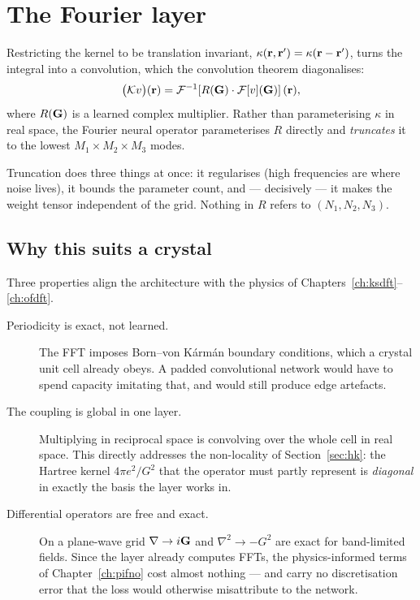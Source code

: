 \section{The Fourier layer}

Restricting the kernel to be translation invariant, $\kappa(\mathbf{r},\mathbf{r}')
= \kappa(\mathbf{r}-\mathbf{r}')$, turns the integral into a convolution, which the
convolution theorem diagonalises:
\begin{equation}
  \bigl(\mathcal{K}v\bigr)(\mathbf{r})
    = \mathcal{F}^{-1}\!\left[ R(\mathbf{G})\cdot \mathcal{F}[v](\mathbf{G}) \right](\mathbf{r}),
  \label{eq:fourierlayer}
\end{equation}
where $R(\mathbf{G})$ is a learned complex multiplier. Rather than parameterising
$\kappa$ in real space, the Fourier neural operator parameterises $R$ directly
and \emph{truncates} it to the lowest $M_1{\times}M_2{\times}M_3$ modes.

Truncation does three things at once: it regularises (high frequencies are
where noise lives), it bounds the parameter count, and --- decisively --- it
makes the weight tensor independent of the grid. Nothing in $R$ refers to
$(N_1,N_2,N_3)$.

\subsection{Why this suits a crystal}

Three properties align the architecture with the physics of
Chapters~\ref{ch:ksdft}--\ref{ch:ofdft}.

\begin{description}
  \item[Periodicity is exact, not learned.] The FFT imposes Born--von Kármán
    boundary conditions, which a crystal unit cell already obeys. A padded
    convolutional network would have to spend capacity imitating that, and
    would still produce edge artefacts.
  \item[The coupling is global in one layer.] Multiplying in reciprocal space
    is convolving over the whole cell in real space. This directly addresses
    the non-locality of Section~\ref{sec:hk}: the Hartree kernel
    $4\pi e^2/G^2$ that the operator must partly represent is
    \emph{diagonal} in exactly the basis the layer works in.
  \item[Differential operators are free and exact.] On a plane-wave grid
    $\nabla \to i\mathbf{G}$ and $\nabla^2 \to -G^2$ are exact for band-limited
    fields. Since the layer already computes FFTs, the physics-informed terms
    of Chapter~\ref{ch:pifno} cost almost nothing --- and carry no
    discretisation error that the loss would otherwise misattribute to the
    network.
\end{description}

